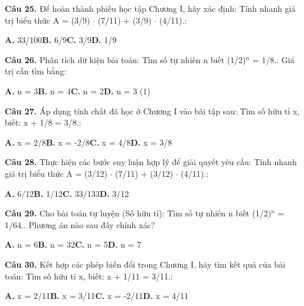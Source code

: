 \documentclass[11pt,a4paper]{article}
\begin{document}
\textbf{\color{primary} Câu 25.} Để hoàn thành phiếu học tập Chương I, hãy xác định: Tính nhanh giá trị biểu thức A = (3/9) $\cdot$ (7/11) + (3/9) $\cdot$ (4/11).:\par
\hspace*{1.5em}\textbf{A.} 33/100\quad\quad \textbf{B.} 6/9\quad\quad \textbf{C.} 3/9\quad\quad \textbf{D.} 1/9\par\vspace{2pt}
\textbf{\color{primary} Câu 26.} Phân tích dữ kiện bài toán: Tìm số tự nhiên n biết (1/2)$^{n}$ = 1/8.. Giá trị cần tìm bằng:\par
\hspace*{1.5em}\textbf{A.} n = 3\quad\quad \textbf{B.} n = 4\quad\quad \textbf{C.} n = 2\quad\quad \textbf{D.} n = 3 (1)\par\vspace{2pt}
\textbf{\color{primary} Câu 27.} Áp dụng tính chất đã học ở Chương I vào bài tập sau: Tìm số hữu tỉ x, biết: x + 1/8 = 3/8.:\par
\hspace*{1.5em}\textbf{A.} x = 2/8\quad\quad \textbf{B.} x = -2/8\quad\quad \textbf{C.} x = 4/8\quad\quad \textbf{D.} x = 3/8\par\vspace{2pt}
\textbf{\color{primary} Câu 28.} Thực hiện các bước suy luận hợp lý để giải quyết yêu cầu: Tính nhanh giá trị biểu thức A = (3/12) $\cdot$ (7/11) + (3/12) $\cdot$ (4/11).:\par
\hspace*{1.5em}\textbf{A.} 6/12\quad\quad \textbf{B.} 1/12\quad\quad \textbf{C.} 33/133\quad\quad \textbf{D.} 3/12\par\vspace{2pt}
\textbf{\color{primary} Câu 29.} Cho bài toán tự luyện (Số hữu tỉ): Tìm số tự nhiên n biết (1/2)$^{n}$ = 1/64.. Phương án nào sau đây chính xác?\par
\hspace*{1.5em}\textbf{A.} n = 6\quad\quad \textbf{B.} n = 32\quad\quad \textbf{C.} n = 5\quad\quad \textbf{D.} n = 7\par\vspace{2pt}
\textbf{\color{primary} Câu 30.} Kết hợp các phép biến đổi trong Chương I, hãy tìm kết quả của bài toán: Tìm số hữu tỉ x, biết: x + 1/11 = 3/11.:\par
\hspace*{1.5em}\textbf{A.} x = 2/11\quad\quad \textbf{B.} x = 3/11\quad\quad \textbf{C.} x = -2/11\quad\quad \textbf{D.} x = 4/11\par\vspace{2pt}
\end{document}
